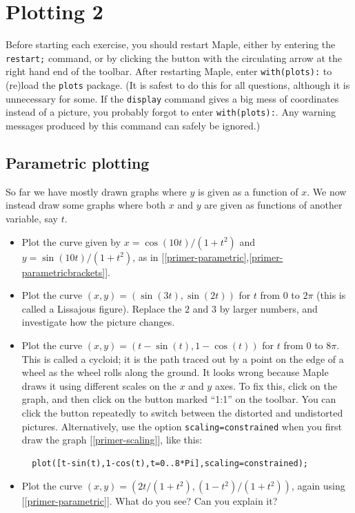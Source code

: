 \documentclass[a4paper,10pt]{amsbook}
\begin{document}
\chapter{Plotting 2}

Before starting each exercise, you should restart Maple, either by
entering the \verb~restart;~ command, or by clicking the button with
the circulating arrow at the right hand end of the toolbar.  After
restarting Maple, enter \verb~with(plots):~ to (re)load the
\verb~plots~ package.  (It is safest to do this for all questions,
although it is unnecessary for some.  If the \verb~display~ command
gives a big mess of coordinates instead of a picture, you probably
forgot to enter \verb~with(plots):~.  Any warning messages produced by
this command can safely be ignored.)

\section{Parametric plotting}

So far we have mostly drawn graphs where $y$ is given as a function of
$x$.  We now instead draw some graphs where both $x$ and $y$ are given
as functions of another variable, say $t$.

\begin{exercise}
 \begin{itemize}
  \item[(a)]
   Plot the curve given by $x=\cos(10t)/(1+t^2)$ and $y=\sin(10t)/(1+t^2)$,
   as in [\ref{primer-parametric},\ref{primer-parametricbrackets}].
  \item[(b)]
   Plot the curve $(x,y)=(\sin(3t),\sin(2t))$ for $t$ from $0$ to
   $2\pi$ (this is called a Lissajous figure).  Replace the $2$ and
   $3$ by larger numbers, and investigate how the picture changes.
  \item[(c)]
   Plot the curve $(x,y)=(t-\sin(t),1-\cos(t))$ for $t$ from $0$ to
   $8\pi$.  This is called a cycloid; it is the path traced out by a
   point on the edge of a wheel as the wheel rolls along the ground.
   It looks wrong because Maple draws it using different scales on the
   $x$ and $y$ axes.  To fix this, click on the graph, and then click
   on the button marked ``1:1'' on the toolbar.  You can click the
   button repeatedly to switch between the distorted and undistorted
   pictures.  Alternatively, use the option \verb~scaling=constrained~
   when you first draw the graph [\ref{primer-scaling}], like this:
\begin{verbatim}
  plot([t-sin(t),1-cos(t),t=0..8*Pi],scaling=constrained);
\end{verbatim}
  \item[(d)] Plot the curve
   $(x,y)=(2t/(1+t^2),(1-t^2)/(1+t^2))$, again using
   [\ref{primer-parametric}].  What do you see?  Can you
   explain it?
 \end{itemize}
\end{exercise}
\end{document}
